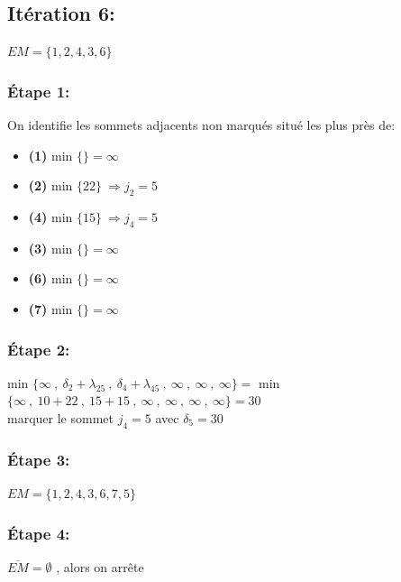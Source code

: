 \documentclass{article}
\begin{document}
\subsection*{Itération 6:}
$EM = \{1,2,4,3,6\}$
\subsubsection*{Étape 1:}
On identifie les sommets adjacents non marqués situé les plus près de:
\begin{itemize}
    \item \textbf{(1)} min $\{\}=\infty$
    \item \textbf{(2)} min $\{22\}\: \Rightarrow j_2 = 5$ 
    \item \textbf{(4)} min $\{15\}\: \Rightarrow j_4 =5$ 
    \item \textbf{(3)} min $\{\}= \infty$
    \item \textbf{(6)} min $\{\}= \infty$
    \item \textbf{(7)} min $\{\}= \infty$
\end{itemize}
\subsubsection*{Étape 2:}
min $\{ \infty \:,\: \delta_2 +\lambda_{25} \:,\: \delta_4 + \lambda_{45} \:,\: \infty \:,\:\infty \:,\:\infty \} = $ min $\{\infty \:,\: 10+22\:,\:15+15\:,\: \infty \:,\:\infty \:,\:\infty \:,\:\infty\}=30$\\
marquer le sommet $j_4=5$ avec $\delta_5=30$ 
\subsubsection*{Étape 3:}
$EM=\{1,2,4,3,6,7,5\}$
\subsubsection*{Étape 4:}
$\overline{EM} = \emptyset $ , alors on arrête 
\end{document}
